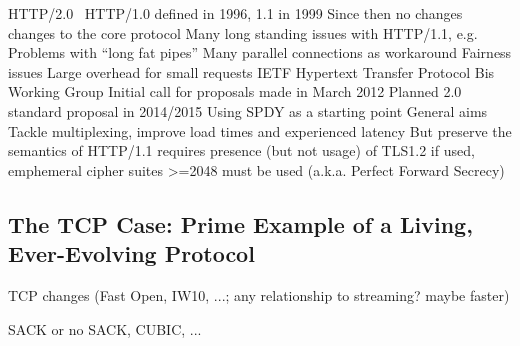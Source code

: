 HTTP/2.0~\cite{http20draft}
 HTTP/1.0 defined in 1996, 1.1 in 1999
	Since then no changes changes to the core protocol
 Many long standing issues with HTTP/1.1, e.g.
	Problems with ``long fat pipes''
		Many parallel connections as workaround
		Fairness issues
	Large overhead for small requests
 IETF Hypertext Transfer Protocol Bis Working Group
 Initial call for proposals made in March 2012
 Planned 2.0 standard proposal in 2014/2015
 Using SPDY as a starting point
 General aims
	Tackle multiplexing, improve load times and experienced latency
	But preserve the semantics of HTTP/1.1
requires presence (but not usage) of TLS1.2
	if used, emphemeral cipher suites >=2048 must be used (a.k.a. Perfect Forward Secrecy)












\subsection{The TCP Case: Prime Example of a Living, Ever-Evolving Protocol}

\gls{TCP} changes (Fast Open, IW10, ...; any relationship to streaming? maybe faster)

SACK or no SACK, CUBIC, ...

